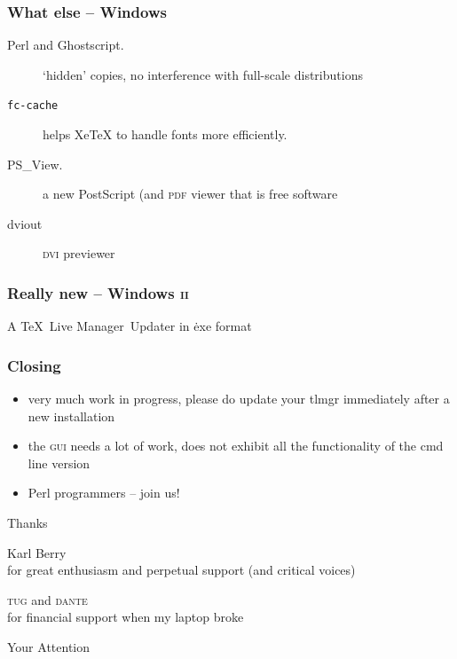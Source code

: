 \documentclass{beamer}
\newcommand{\acro}[1]{\textsc{\MakeLowercase{#1}}}
\newcommand{\tlmgr}{\TeX~Live Manager}
\newcommand{\XeTeX}{Xe\TeX}
\def\bigit{\\[\bigskipamount]}
\begin{document}
\begin{frame}
  \frametitle{What else -- Windows}
  \begin{description}
  \item[Perl and Ghostscript.] `hidden' copies, no interference with
    full-scale distributions\bigit
  \item[\texttt{fc-cache}] helps \XeTeX{} to handle fonts more
    efficiently.\bigit
  \item[PS\_View.] a new PostScript (and \acro{PDF} viewer
    that is free software\bigit
  \item[dviout] \acro{DVI} previewer
  \end{description}
\end{frame}

\begin{frame}
  \frametitle{Really new -- Windows \acro{II}}
  A \tlmgr\ Updater in \.exe format
\end{frame}

\begin{frame}
  \frametitle{Closing}
  \begin{itemize}
  \item very much work in progress, please do update your tlmgr
    immediately after a new installation\bigit
    \pause
  \item the \acro{GUI} needs a lot of work, does not exhibit all the
    functionality of the cmd line version \bigit
    \pause
  \item Perl programmers -- join us!\bigit
  \end{itemize}
\end{frame}

\begin{frame}
  \begin{center}
    {\Large Thanks}

    \bigskip
    Karl Berry\\
    {\small for great enthusiasm and  perpetual
      support (and critical voices)}
    
    \pause
    \bigskip
    \acro{TUG} and \acro{DANTE}\\
    {\small for financial support when my laptop broke}
    
    \pause
    \bigskip
    Your Attention
  \end{center}
\end{frame}
\end{document}
